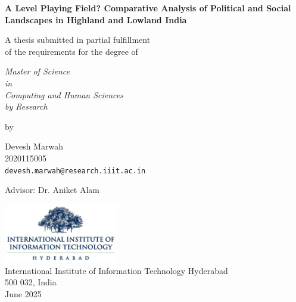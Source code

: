 \thispagestyle{empty}
\begin{center}
\vspace*{1.5cm}
{\Large \bf A Level Playing Field? Comparative Analysis of Political and Social Landscapes in Highland and Lowland India}

\vspace*{2.2cm}
{\large A thesis submitted in partial fulfillment\\}
{\large  of the requirements for the degree of \\}

\vspace*{1cm}
{\it {\large Master of Science } \\
{\large in\\}
{\large Computing and Human Sciences \\}
{\large by Research \\}}


\vspace*{0.8cm}
{\large by}

\vspace*{6mm}
{\large Devesh Marwah\\}
{\large 2020115005\\
{\small \tt devesh.marwah@research.iiit.ac.in}}

\vspace*{5mm}
{\large Advisor: Dr. Aniket Alam\\}


\vspace*{2.0cm}
{\includegraphics[width=5cm]{figures/iiit.png}\\}
{\large International Institute of Information Technology Hyderabad\\}
{\large 500 032, India\\}
\vspace*{5mm}
{\large June 2025\\}
\end{center}
